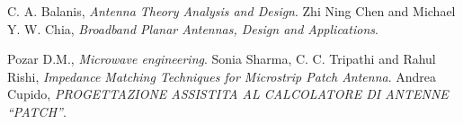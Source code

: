 \documentclass[twoside,twocolumn]{article}
\begin{document}




%
\begin{thebibliography}{99} %

 C. A. Balanis, \emph
{Antenna Theory Analysis and Design}.
 Zhi Ning Chen and Michael Y. W. Chia, \emph
{Broadband Planar Antennas, Design and Applications}.

 Pozar D.M., \emph
{Microwave engineering}.
 Sonia Sharma, C. C. Tripathi and Rahul Rishi, \emph
{Impedance Matching Techniques for Microstrip
Patch Antenna}.
 Andrea Cupido, \emph
{PROGETTAZIONE ASSISTITA AL CALCOLATORE DI ANTENNE “PATCH”}.

\end{thebibliography}

\end{document}

